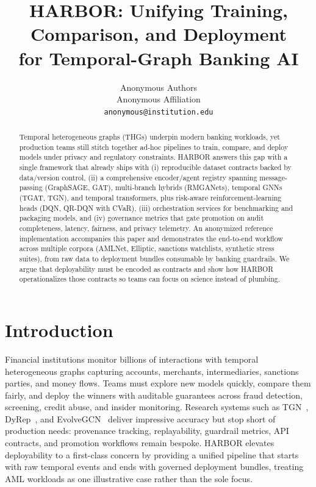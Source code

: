 \documentclass[letterpaper]{article}
\title{HARBOR: Unifying Training, Comparison, and Deployment\\for Temporal-Graph Banking AI}
\author{
Anonymous Authors\\
Anonymous Affiliation\\
\texttt{anonymous@institution.edu}
}
\begin{document}
\maketitle

\begin{abstract}
Temporal heterogeneous graphs (THGs) underpin modern banking workloads, yet production teams still stitch together ad-hoc pipelines to train, compare, and deploy models under privacy and regulatory constraints. \textsc{HARBOR} answers this gap with a single framework that already ships with (i) reproducible dataset contracts backed by data/version control, (ii) a comprehensive encoder/agent registry spanning message-passing (GraphSAGE, GAT), multi-branch hybrids (RMGANets), temporal GNNs (TGAT, TGN), and temporal transformers, plus risk-aware reinforcement-learning heads (DQN, QR-DQN with CVaR), (iii) orchestration services for benchmarking and packaging models, and (iv) governance metrics that gate promotion on audit completeness, latency, fairness, and privacy telemetry. An anonymized reference implementation accompanies this paper and demonstrates the end-to-end workflow across multiple corpora (AMLNet, Elliptic, sanctions watchlists, synthetic stress suites), from raw data to deployment bundles consumable by banking guardrails. We argue that deployability must be encoded as contracts and show how \textsc{HARBOR} operationalizes those contracts so teams can focus on science instead of plumbing.
\end{abstract}

\section{Introduction}
Financial institutions monitor billions of interactions with temporal heterogeneous graphs capturing accounts, merchants, intermediaries, sanctions parties, and money flows. Teams must explore new models quickly, compare them fairly, and deploy the winners with auditable guarantees across fraud detection, screening, credit abuse, and insider monitoring. Research systems such as TGN~\citep{rossi2020tgn}, DyRep~\citep{trivedi2019dyrep}, and EvolveGCN~\citep{pareja2020evolvegcn} deliver impressive accuracy but stop short of production needs: provenance tracking, replayability, guardrail metrics, API contracts, and promotion workflows remain bespoke. \textsc{HARBOR} elevates deployability to a first-class concern by providing a unified pipeline that starts with raw temporal events and ends with governed deployment bundles, treating AML workloads as one illustrative case rather than the sole focus.
\end{document}
